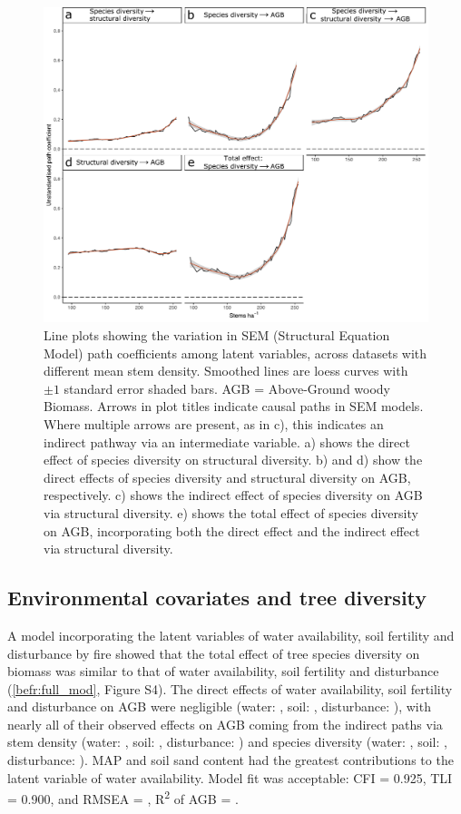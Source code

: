 \begin{refsection}
\begin{figure}
	\includegraphics[width=0.8\linewidth]{img/sem_struc_stems_ha}
	\caption[Effect of stems density on path coefficients]{Line plots showing the variation in SEM (Structural Equation Model) path coefficients among latent variables, across datasets with different mean stem density. Smoothed lines are loess curves with $\pm1$ standard error shaded bars. AGB = Above-Ground woody Biomass. Arrows in plot titles indicate causal paths in SEM models. Where multiple arrows are present, as in c), this indicates an indirect pathway via an intermediate variable. a) shows the direct effect of species diversity on structural diversity. b) and d) show the direct effects of species diversity and structural diversity on AGB, respectively. c) shows the indirect effect of species diversity on AGB via structural diversity. e) shows the total effect of species diversity on AGB, incorporating both the direct effect and the indirect effect via structural diversity.}
	\label{befr:sem_struc_stems_ha}
\end{figure}

\subsection{Environmental covariates and tree diversity}
\label{befr:ssec:env}

A model incorporating the latent variables of water availability, soil fertility and disturbance by fire showed that the total effect of tree species diversity on biomass was similar to that of water availability, soil fertility and disturbance (\autoref{befr:full_mod}, Figure S4). The direct effects of water availability, soil fertility and disturbance on AGB were negligible (water: \fmbetamb{}, soil: \fmbetasb{}, disturbance: \fmbetafb{}), with nearly all of their observed effects on AGB coming from the indirect paths via stem density (water: \fmbetamib{}, soil: \fmbetasib{}, disturbance: \fmbetafib{}) and species diversity (water: \fmbetamd{}, soil: \fmbetasd{}, disturbance: \fmbetafd{}). MAP and soil sand content had the greatest contributions to the latent variable of water availability. Model fit was acceptable: CFI = 0.925, TLI = 0.900, and RMSEA = \fmrmsea{}, R\textsuperscript{2} of AGB = \fmrsq{}. 


\end{refsection}

